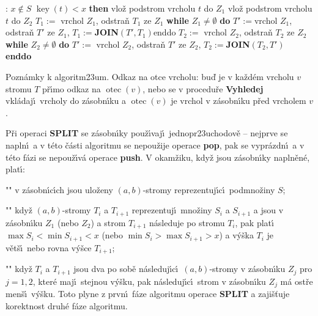 \documentclass[a4paper,12pt]{article}
\DeclareMathOperator*{\otec}{otec}
\DeclareMathOperator*{\key}{key}
\begin{document}
\phantom{---}{\bf V\'ystup}: $x\notin S$\newline 
\phantom{---}{\bf if} $\key(t)<x$ {\bf then}\newline 
\phantom{------}vlo\v z podstrom vrcholu $t$ do $Z_1$\newline 
\phantom{---}{\bf else}\newline 
\phantom{------}vlo\v z podstrom vrcholu $t$ do $Z_2$\newline 
\phantom{---}{\bf endif\newline 
endif}\newline 
$T_1:=\text{ vrchol }Z_1$, odstra\v n $T_1$ ze $Z_1$\newline 
{\bf while} $Z_1\ne\emptyset$ {\bf do}\newline 
\phantom{---}$T':=$vrchol $Z_1$, odstra\v n $T'$ ze $Z_1$, $T_1:=${\bf JOIN}$(T',T_1)$\newline enddo\newline 
$T_2:=\text{ vrchol }Z_2$, odstra\v n $T_2$ ze $Z_2$\newline 
{\bf while} $Z_2\ne\emptyset$ {\bf do}\newline 
$T':=\text{ vrchol }Z_2$, odstra\v n $T'$ ze $Z_2$, $T_2:=${\bf JOIN$(T_2,T')$\newline 
enddo}
\medskip

\flushpar Pozn\'amky k algoritm\accent23um. \newline 
Odkaz na otce vrcholu: bu\v d je v ka\v zd\'em vrcholu $v$ 
stromu $T$ p\v r\'\i mo odkaz na $\otec(v)$, nebo se v procedu\v re 
{\bf Vyhledej} vkl\'ada\-j\'\i\ vrcholy do z\'asobn\'\i ku a $\otec
(v)$ 
je vrchol v z\'asobn\'\i ku p\v red vrcholem $v$.
\smallskip

\flushpar P\v ri operaci {\bf SPLIT} se z\'asobn\'\i ky pou\v z\'\i vaj\'\i\ 
jednopr\accent23uchodov\v e -- nejprve se napln\'\i\ a v t\'eto \v c\'asti 
algoritmu se nepou\v zije operace {\bf pop}, pak se vypr\'azdn\'\i\ a v t\'eto 
f\'azi se nepou\v z\'\i v\'a operace {\bf push}. V okam\v ziku, kdy\v z jsou 
z\'asobn\'\i ky napln\v en\'e, plat\'\i :
\roster
\item"{}"
v z\'asobn\'\i c\'\i ch jsou ulo\v zeny $(a,b)$-stromy reprezentuj\'\i c\'\i\ 
podmno\v ziny $S$;
\item"{}" 
kdy\v z $(a,b)$-stromy $T_i$ a $T_{i+1}$ reprezentuj\'\i\ mno\v ziny $S_
i$ a $S_{i+1}$ a jsou v z\'a\-sobn\'\i ku $Z_1$ (nebo $Z_2$) a strom $T_{i+1}$ n\'asleduje 
po stromu $T_{i}$, pak plat\'\i\ $\max S_i<\min S_{i+1}<x$ (nebo 
$\min S_i>\max S_{i+1}>x$) a v\'y\v ska $T_i$ je v\v et\v s\'\i\ nebo 
rovna v\'y\v sce $T_{i+1}$;
\item"{}"
kdy\v z $T_i$ a $T_{i+1}$ jsou dva po sob\v e n\'asleduj\'\i c\'\i\ $
(a,b)$-stromy v 
z\'asobn\'\i ku $Z_j$ pro $j=1,2$, kter\'e maj\'\i\ stejnou v\'y\v sku, pak 
n\'asleduj\'\i c\'\i\ strom v z\'asobn\'\i ku $Z_j$ m\'a ost\v re men\v s\'\i\ v\'y\v sku.
\endroster
\flushpar Toto plyne z prvn\'\i\ f\'aze algoritmu operace {\bf SPLIT} a zaji\v s\v tuje 
korektnost druh\'e f\'aze algoritmu. 
\medskip
\end{document}
